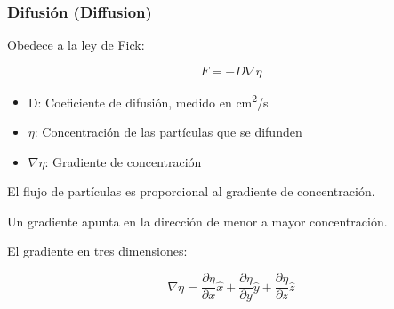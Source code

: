 \documentclass[10pt,t,aspectratio=169]{beamer}
\begin{document}
\begin{frame}[t]
    \frametitle{Difusión (Diffusion)}

    Obedece a la ley de Fick:	

    \[ F = -D \nabla \eta \]

    \begin{itemize}
        \item D: Coeficiente de difusión, medido en cm\textsuperscript{2}/s
        \item $\eta$: Concentración de las partículas que se difunden
        \item $\nabla{}\eta$: Gradiente de concentración
    \end{itemize}

    \vspace{5mm}
    El flujo de partículas es proporcional al gradiente de concentración.

    \vspace{3mm}
    Un gradiente apunta en la dirección de menor a mayor concentración.

    \vspace{3mm}
    El gradiente en tres dimensiones:

    \[ \nabla{}\eta = \dfrac{\partial{}\eta}{\partial{}x} \hat{x} + \dfrac{\partial{}\eta}{\partial{}y} \hat{y} + \dfrac{\partial{}\eta}{\partial{}z} \hat{z} \]
\end{frame}
\end{document}
